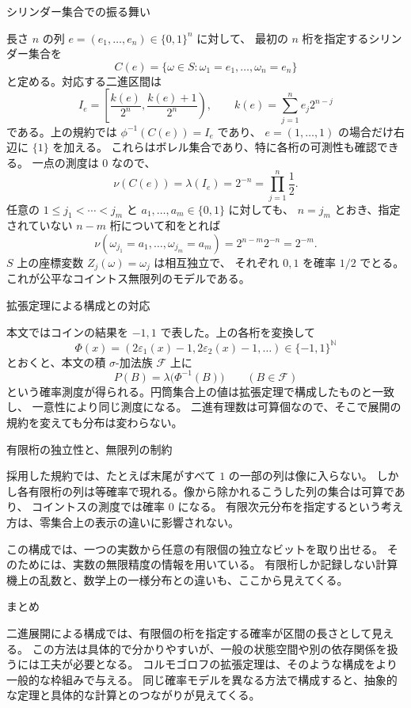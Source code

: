 \documentclass[a4paper,10pt,pdflatex,ja=standard,jafont=ipaex-type1,
  magstyle=real,scale=1]{bxjsarticle}
\newcommand{\columnheading}[1]{\par\vspace{5pt}
  {\fontsize{11pt}{15pt}\selectfont\sffamily\mdseries\color{accent}#1}\par\vspace{2pt}}
\newcommand{\F}{\mathcal F}
\newcommand{\N}{\mathbb N}
\begin{document}
\columnheading{シリンダー集合での振る舞い}
長さ $n$ の列 $e=(e_1,\ldots,e_n)\in\{0,1\}^n$ に対して、
最初の $n$ 桁を指定するシリンダー集合を
$$
  C(e)=\{\omega\in S:\omega_1=e_1,\ldots,\omega_n=e_n\}
$$
と定める。対応する二進区間は
$$
  I_e=\left[\frac{k(e)}{2^n},\frac{k(e)+1}{2^n}\right),\qquad
  k(e)=\sum_{j=1}^n e_j2^{n-j}
$$
である。上の規約では $\phi^{-1}(C(e))=I_e$ であり、
$e=(1,\ldots,1)$ の場合だけ右辺に $\{1\}$ を加える。
これらはボレル集合であり、特に各桁の可測性も確認できる。
一点の測度は $0$ なので、
$$
  \nu(C(e))=\lambda(I_e)=2^{-n}=\prod_{j=1}^n\frac12.
$$
任意の $1\le j_1<\cdots<j_m$ と $a_1,\ldots,a_m\in\{0,1\}$ に対しても、
$n=j_m$ とおき、指定されていない $n-m$ 桁について和をとれば
$$
  \nu(\omega_{j_1}=a_1,\ldots,\omega_{j_m}=a_m)
  =2^{n-m}2^{-n}=2^{-m}.
$$
$S$ 上の座標変数 $Z_j(\omega)=\omega_j$ は相互独立で、
それぞれ $0,1$ を確率 $1/2$ でとる。これが公平なコイントス無限列のモデルである。

\newpage
\columnheading{拡張定理による構成との対応}
本文ではコインの結果を $-1,1$ で表した。上の各桁を変換して
$$
  \Phi(x)=(2\varepsilon_1(x)-1,2\varepsilon_2(x)-1,\ldots)
  \in\{-1,1\}^{\N}
$$
とおくと、本文の積 $\sigma$-加法族 $\F$ 上に
$$P(B)=\lambda\bigl(\Phi^{-1}(B)\bigr)\qquad(B\in\F)$$
という確率測度が得られる。円筒集合上の値は拡張定理で構成したものと一致し、
一意性により同じ測度になる。
二進有理数は可算個なので、そこで展開の規約を変えても分布は変わらない。

\columnheading{有限桁の独立性と、無限列の制約}
採用した規約では、たとえば末尾がすべて $1$ の一部の列は像に入らない。
しかし各有限桁の列は等確率で現れる。像から除かれるこうした列の集合は可算であり、
コイントスの測度では確率 $0$ になる。
有限次元分布を指定するという考え方は、零集合上の表示の違いに影響されない。

この構成では、一つの実数から任意の有限個の独立なビットを取り出せる。
そのためには、実数の無限精度の情報を用いている。
有限桁しか記録しない計算機上の乱数と、数学上の一様分布との違いも、ここから見えてくる。

\columnheading{まとめ}
二進展開による構成では、有限個の桁を指定する確率が区間の長さとして見える。
この方法は具体的で分かりやすいが、一般の状態空間や別の依存関係を扱うには工夫が必要となる。
コルモゴロフの拡張定理は、そのような構成をより一般的な枠組みで与える。
同じ確率モデルを異なる方法で構成すると、抽象的な定理と具体的な計算とのつながりが見えてくる。

\label{lastpage}
\end{document}
